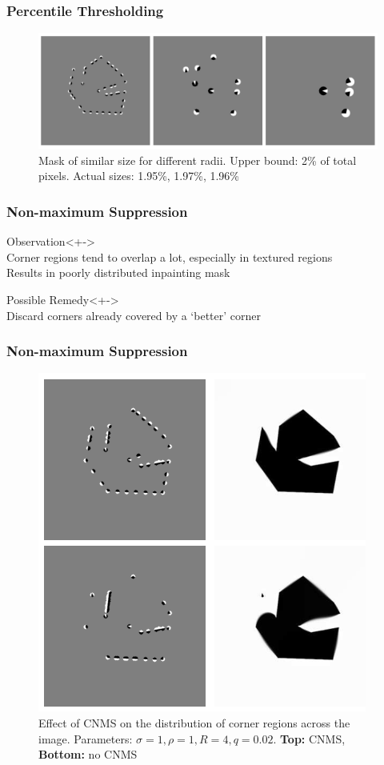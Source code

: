 \documentclass{beamer}
\begin{document}
    \begin{frame}[t]
        \frametitle{Percentile Thresholding}
        \begin{figure}[htpb]
            \centering
            \includegraphics[width=\linewidth]{images/tppt.png}
            \caption{Mask of similar size for different radii. Upper bound: 2\% of total pixels.
            Actual sizes: 1.95\%, 1.97\%, 1.96\%}
        \end{figure}
    \end{frame}

     \begin{frame}[t]
        \frametitle{Non-maximum Suppression}
        \begin{block}{Observation}<+->\ \\
            Corner regions tend to overlap a lot, especially in textured regions\\
            Results in poorly distributed inpainting mask
        \end{block} 
        \begin{block}{Possible Remedy}<+->\ \\
            Discard corners already covered by a `better' corner 
        \end{block}
     \end{frame} 

    \begin{frame}[t]
        \frametitle{Non-maximum Suppression}
        \begin{figure}[htpb]
            \centering
            \includegraphics[height=0.5\linewidth]{images/cnms2.png}
            \caption{Effect of CNMS on the distribution of corner regions across the image.
            Parameters: $\sigma=1,\rho=1,R=4,q=0.02$. \textbf{Top:} CNMS, \textbf{Bottom:} no CNMS}
        \end{figure} 
    \end{frame}
\end{document}
